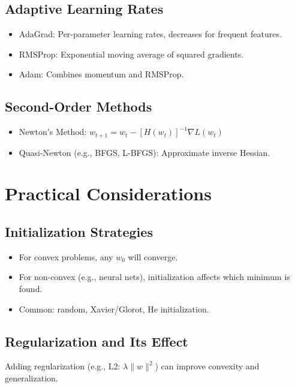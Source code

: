 \documentclass{article}
\begin{document}
\subsection{Adaptive Learning Rates}
\begin{itemize}
    \item AdaGrad: Per-parameter learning rates, decreases for frequent features.
    \item RMSProp: Exponential moving average of squared gradients.
    \item Adam: Combines momentum and RMSProp.
\end{itemize}

\subsection{Second-Order Methods}
\begin{itemize}
    \item Newton's Method: $w_{t+1} = w_t - [H(w_t)]^{-1} \nabla L(w_t)$
    \item Quasi-Newton (e.g., BFGS, L-BFGS): Approximate inverse Hessian.
\end{itemize}
\section{Practical Considerations}

\subsection{Initialization Strategies}
\begin{itemize}
    \item For convex problems, any $w_0$ will converge.
    \item For non-convex (e.g., neural nets), initialization affects which minimum is found.
    \item Common: random, Xavier/Glorot, He initialization.
\end{itemize}

\subsection{Regularization and Its Effect}
Adding regularization (e.g., L2: $\lambda \|w\|^2$) can improve convexity and generalization.
\end{document}
